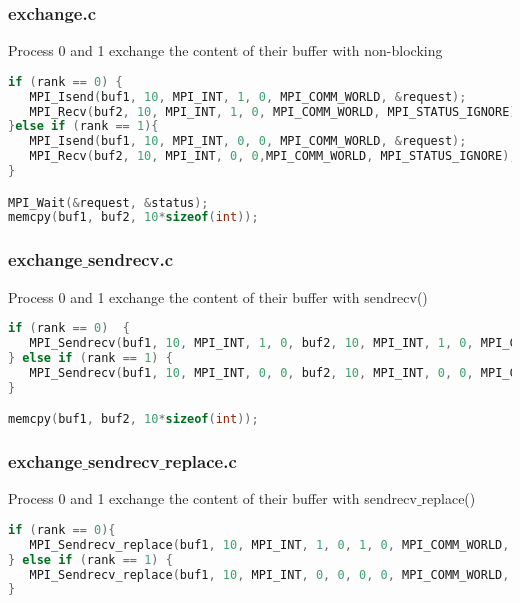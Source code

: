 \begin{frame}[containsverbatim]
\frametitle{exchange.c}
Process 0 and 1 exchange the content of their buffer with non-blocking \label{call}
\begin{lstlisting}[language=C,frame=lines]
if (rank == 0) {
   MPI_Isend(buf1, 10, MPI_INT, 1, 0, MPI_COMM_WORLD, &request);
   MPI_Recv(buf2, 10, MPI_INT, 1, 0, MPI_COMM_WORLD, MPI_STATUS_IGNORE);
}else if (rank == 1){
   MPI_Isend(buf1, 10, MPI_INT, 0, 0, MPI_COMM_WORLD, &request);
   MPI_Recv(buf2, 10, MPI_INT, 0, 0,MPI_COMM_WORLD, MPI_STATUS_IGNORE);
}

MPI_Wait(&request, &status);
memcpy(buf1, buf2, 10*sizeof(int));
\end{lstlisting}
\end{frame}


\begin{frame}[containsverbatim]
\frametitle{exchange$\_$sendrecv.c}
Process 0 and 1 exchange the content of their buffer with sendrecv()
\begin{lstlisting}[language=C,frame=lines]
if (rank == 0)	{
   MPI_Sendrecv(buf1, 10, MPI_INT, 1, 0, buf2, 10, MPI_INT, 1, 0, MPI_COMM_WORLD, MPI_STATUS_IGNORE);
} else if (rank == 1) {
   MPI_Sendrecv(buf1, 10, MPI_INT, 0, 0, buf2, 10, MPI_INT, 0, 0, MPI_COMM_WORLD, MPI_STATUS_IGNORE);
}

memcpy(buf1, buf2, 10*sizeof(int));
\end{lstlisting}
\end{frame}

\begin{frame}[containsverbatim]
\frametitle{exchange$\_$sendrecv$\_$replace.c}
Process 0 and 1 exchange the content of their buffer with sendrecv$\_$replace()
\begin{lstlisting}[language=C,frame=lines]
if (rank == 0){
   MPI_Sendrecv_replace(buf1, 10, MPI_INT, 1, 0, 1, 0, MPI_COMM_WORLD, MPI_STATUS_IGNORE);
} else if (rank == 1) {
   MPI_Sendrecv_replace(buf1, 10, MPI_INT, 0, 0, 0, 0, MPI_COMM_WORLD, MPI_STATUS_IGNORE);
}
\end{lstlisting}
\end{frame}


